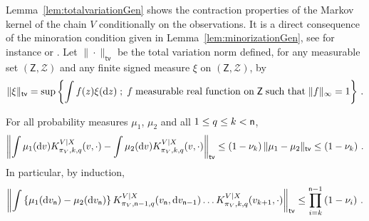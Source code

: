 \noindent
Lemma~\ref{lem:totalvariationGen} shows the contraction properties of the Markov kernel of the chain $V$ conditionally on the observations. It is a direct consequence of the minoration condition given in Lemma~\ref{lem:minorizationGen}, see for instance \cite[Sections III.9 to III.11]{lindvall:1992} or \cite[Corollary~4.3.9 and Lemma~4.3.13]{cappe:moulines:ryden:2005}. Let $\|\cdot\|_{\mathsf{tv}}$ be the total variation norm defined, for any measurable set $(\mathsf{Z},\mathcal{Z})$ and any finite signed measure $\xi$ on $(\mathsf{Z},\mathcal{Z})$, by
\[
\|\xi\|_{\mathsf{tv}} = \mathrm{sup}\left\{\int f(z) \xi(\mathrm{d} z) \;;\;f\; \mbox{measurable real function on\;}\mathsf{Z}\;\mbox{such that\;}\|f\|_{\infty} = 1\right\}\,.
\]
\begin{lemma}
\label{lem:totalvariationGen}
For all probability measures $\mu_1$, $\mu_2$ and all $1\le q\le k < {\mathsf n}$,
\[
\left\|\int \mu_1 (\mathrm{d} v)K^{V|X}_{\pi_V,k,q}(v,\cdot) - \int \mu_2 (\mathrm{d} v)K^{V|X}_{\pi_V,k,q}(v,\cdot) \right\|_{\mathsf{tv}}\le \left(1-\nu_k\right)\|\mu_1-\mu_2\|_{\mathsf{tv}}\le \left(1-\nu_k\right)\,.
\]
In particular, by induction,
\begin{equation}
\label{eq:exp:forgettingGen}
\left\|\int \left\{\mu_1(\rmd v_{\nobs})-\mu_2(\rmd v_{\nobs})\right\} K^{V|X}_{\pi_V,\nobs-1,q}(v_{\nobs},\rmd v_{\nobs-1})\ldots K^{V|X}_{\pi_V,k,q}(v_{k+1},\cdot)\right\|_{\mathsf{tv}}\le \prod_{i=k}^{\nobs-1}\left(1-\nu_i\right)\eqsp.
\end{equation}
\end{lemma}



